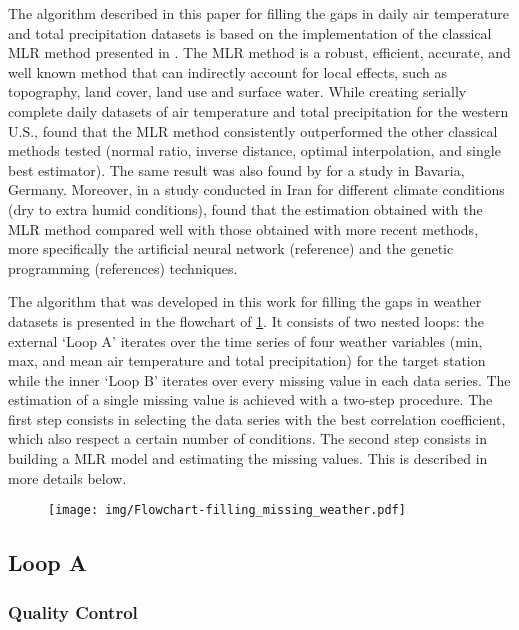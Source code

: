 \documentclass[ARTICLETHERMIC.tex]{subfiles}
\begin{document}
The algorithm described in this paper for filling the gaps in daily air temperature and total precipitation datasets is based on the implementation of the classical MLR method presented in \cite{eischeid_creating_2000}. The MLR method is a robust, efficient, accurate, and well known method that can indirectly account for local effects, such as topography, land cover, land use and surface water. While creating serially complete daily datasets of air temperature and total precipitation for the western U.S., \cite{eischeid_creating_2000} found that the MLR method consistently outperformed the other classical methods tested (normal ratio, inverse distance, optimal interpolation, and single best estimator). The same result was also found by \cite{xia_forest_1999} for a study in Bavaria, Germany. Moreover, in a study conducted in Iran for different climate conditions (dry to extra humid conditions), \cite{kashani_evaluation_2011} found that the estimation obtained with the MLR method compared well with those obtained with more recent methods, more specifically the artificial neural network (reference) and the genetic programming (references) techniques.

The algorithm that was developed in this work for filling the gaps in weather datasets is presented in the flowchart of \cref{fig:fillworker_flowchart}. It consists of two nested loops: the external `Loop A' iterates over the time series of four weather variables (min, max, and mean air temperature and total precipitation) for the target station while the inner `Loop B' iterates over every missing value in each data series. The estimation of a single missing value is achieved with a two-step procedure. The first step consists in selecting the data series with the best correlation coefficient, which also respect a certain number of conditions. The second step consists in building a MLR model and estimating the missing values. This is described in more details below.

\begin{figure}[!p]
    \centering
    \texttt{[image: img/Flowchart-filling\_missing\_weather.pdf]} 
    \caption{}
    \label{fig:fillworker_flowchart}
\end{figure}

\subsection{Loop A}

\subsubsection{Quality Control}
\end{document}
